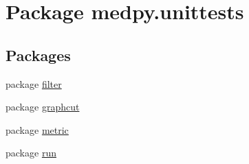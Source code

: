 \hypertarget{namespacemedpy_1_1unittests}{
\section{Package medpy.unittests}
\label{namespacemedpy_1_1unittests}
}
\subsection*{Packages}
\begin{DoxyCompactItemize}
\item 
package \hyperlink{namespacemedpy_1_1unittests_1_1filter}{filter}
\item 
package \hyperlink{namespacemedpy_1_1unittests_1_1graphcut}{graphcut}
\item 
package \hyperlink{namespacemedpy_1_1unittests_1_1metric}{metric}
\item 
package \hyperlink{namespacemedpy_1_1unittests_1_1run}{run}
\end{DoxyCompactItemize}
